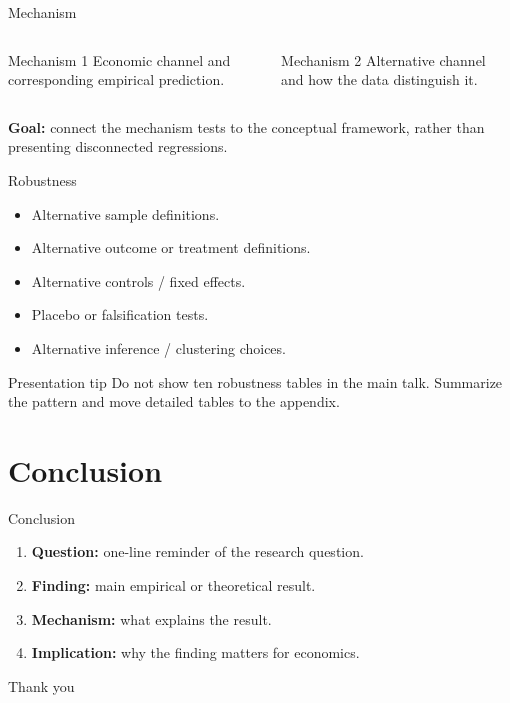 \documentclass[10pt]{beamer}
\begin{document}
\begin{frame}{Mechanism}
\begin{columns}[T]
\begin{block}{Mechanism 1}
Economic channel and corresponding empirical prediction.
\end{block}

\begin{block}{Mechanism 2}
Alternative channel and how the data distinguish it.
\end{block}
\end{columns}

\vspace{1em}
\textbf{Goal:} connect the mechanism tests to the conceptual framework, rather than presenting disconnected regressions.
\end{frame}

\begin{frame}{Robustness}
\begin{itemize}
  \item Alternative sample definitions.
  \item Alternative outcome or treatment definitions.
  \item Alternative controls / fixed effects.
  \item Placebo or falsification tests.
  \item Alternative inference / clustering choices.
\end{itemize}

\vspace{0.7em}
\begin{block}{Presentation tip}
Do not show ten robustness tables in the main talk. Summarize the pattern and move detailed tables to the appendix.
\end{block}
\end{frame}

\section{Conclusion}

\begin{frame}{Conclusion}
\begin{enumerate}
  \item \textbf{Question:} one-line reminder of the research question.
  \item \textbf{Finding:} main empirical or theoretical result.
  \item \textbf{Mechanism:} what explains the result.
  \item \textbf{Implication:} why the finding matters for economics.
\end{enumerate}

\vspace{1em}
\centering
\Large Thank you
\end{frame}
\end{document}
